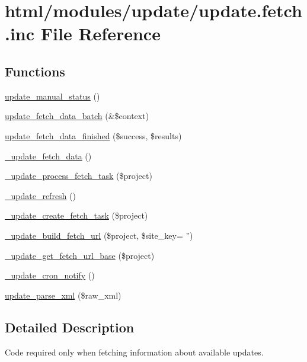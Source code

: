 \hypertarget{update_8fetch_8inc}{
\section{html/modules/update/update.fetch.inc File Reference}
\label{update_8fetch_8inc}
}
\subsection*{Functions}
\begin{DoxyCompactItemize}
\item 
\hyperlink{update_8fetch_8inc_acb92114e3c9f719e50f66ac62ff78e01}{update\_\-manual\_\-status} ()
\item 
\hyperlink{update_8fetch_8inc_a7975896014a8fc9b4e14306a875b97f2}{update\_\-fetch\_\-data\_\-batch} (\&\$context)
\item 
\hyperlink{update_8fetch_8inc_ac901625f220862b797fb5c5cc4dcb654}{update\_\-fetch\_\-data\_\-finished} (\$success, \$results)
\item 
\hyperlink{update_8fetch_8inc_a3a3122bc6fdfe23091d8db56e4430aeb}{\_\-update\_\-fetch\_\-data} ()
\item 
\hyperlink{update_8fetch_8inc_a49b627a7dcb3c714f088bc0e7ef40e85}{\_\-update\_\-process\_\-fetch\_\-task} (\$project)
\item 
\hyperlink{update_8fetch_8inc_aa9814236d331f2e6822435215e9acd8e}{\_\-update\_\-refresh} ()
\item 
\hyperlink{update_8fetch_8inc_a8b22762aaa27e7a0927f4f3ad09ad5e1}{\_\-update\_\-create\_\-fetch\_\-task} (\$project)
\item 
\hyperlink{update_8fetch_8inc_a6d937d41a6ccf645109deefae0f6e5d3}{\_\-update\_\-build\_\-fetch\_\-url} (\$project, \$site\_\-key= '')
\item 
\hyperlink{update_8fetch_8inc_a53552af8849428ac6faba273936eb00a}{\_\-update\_\-get\_\-fetch\_\-url\_\-base} (\$project)
\item 
\hyperlink{update_8fetch_8inc_a55d78e25faf69f49cfc88f2642c06f4e}{\_\-update\_\-cron\_\-notify} ()
\item 
\hyperlink{update_8fetch_8inc_a3d8f5a924c1de0728c829d3c92d60d19}{update\_\-parse\_\-xml} (\$raw\_\-xml)
\end{DoxyCompactItemize}


\subsection{Detailed Description}
Code required only when fetching information about available updates. 

